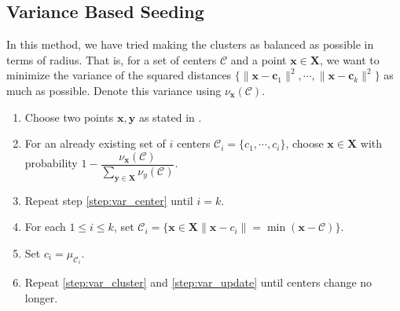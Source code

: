 \documentclass[twoside, 11pt]{article}
\newcommand{\x}{\mathbf{x}}
\newcommand{\X}{\mathbf{X}}
\newcommand{\y}{\mathbf{y}}
\renewcommand{\c}{\mathbf{c}}
\newcommand{\C}{\mathcal{C}}
\begin{document}
	\subsection{Variance Based Seeding}
	In this method, we have tried making the clusters as balanced as possible in terms of radius. That is, for a set of centers $\C$ and a point $\x\in\X$, we want to minimize the variance of the squared distances $\{\|\x-\c_1\|^2,\cdots,\|\x-\c_k\|^2\}$ as much as possible. Denote this variance using $\nu_{\x}(\C)$.
		\begin{enumerate}[i]
			\item Choose two points $\x,\y$ as stated in \citep[Section $4.1$, subsection $4.1.1$]{ostrovsky}.
			\item For an already existing set of $i$ centers $\C_i=\{c_1,\cdots,c_i\}$, choose $\x\in\X$ with probability $1-\dfrac{\nu_{\x}(\C)}{\sum_{\y\in\X}\nu_y(\C)}$.\label{step:var_center}
			\item Repeat step \eqref{step:var_center} until $i=k$.
			\item For each $1\leq i\leq k$, set $\C_i=\{\x\in\X\|\x-c_i\|=\min(\x-\C)\}$.\label{step:var_cluster}
			\item Set $c_i=\mu_{\C_i}$.\label{step:var_update}
			\item Repeat \eqref{step:var_cluster} and \eqref{step:var_update} until centers change no longer.
		\end{enumerate}
\end{document}

